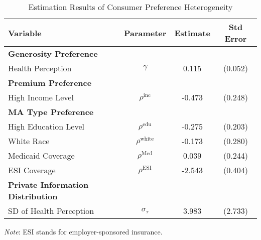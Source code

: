 
\begin{table}[ht]\footnotesize
    \centering
    \caption{Estimation Results of Consumer Preference Heterogeneity}
    \label{tab:demand_result_1}
    \begin{tabular}{lccc}
        \toprule
        \textbf{Variable} & \textbf{Parameter} & \textbf{Estimate} & \textbf{Std Error} \\
        \midrule
        \textbf{Generosity Preference} & & & \\
        Health Perception & $\gamma$ & 0.115 & (0.052) \\
        \midrule
        \textbf{Premium Preference} & & & \\
        High Income Level & $\rho^{\text{inc}}$ & -0.473 & (0.248) \\
        \midrule
        \textbf{MA Type Preference} & & & \\
        High Education Level & $\rho^{\text{edu}}$ & -0.275 & (0.203) \\
        White Race & $\rho^{\text{white}}$ & -0.173 & (0.280) \\
        Medicaid Coverage & $\rho^{\text{Mcd}}$ & 0.039 & (0.244) \\
        ESI Coverage & $\rho^{\text{ESI}}$ & -2.543 & (0.404) \\
        \midrule
        \textbf{Private Information Distribution} & & & \\
        SD of Health Perception & $\sigma_{\tau}$ & 3.983 & (2.733) \\
        \bottomrule
    \end{tabular}
    \begin{threeparttable}
        \begin{tablenotes}\footnotesize
            \item \textit{Note}: ESI stands for employer-sponsored insurance.
        \end{tablenotes}
    \end{threeparttable}
\end{table}
